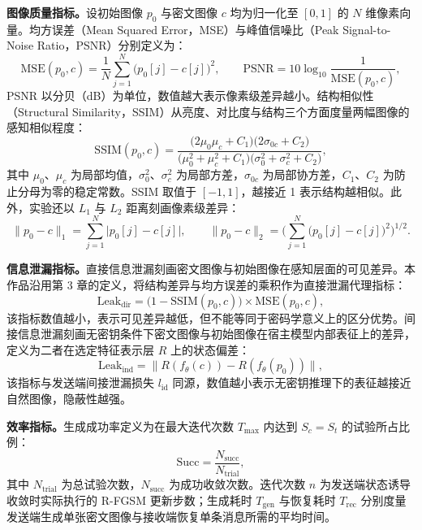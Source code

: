 \textbf{图像质量指标。}设初始图像 \(p_0\) 与密文图像 \(c\) 均为归一化至 \([0,1]\) 的 \(N\) 维像素向量。均方误差（Mean Squared Error，MSE）与峰值信噪比（Peak Signal-to-Noise Ratio，PSNR）分别定义为：
\begin{equation}
    \mathrm{MSE}(p_0,c)=\frac{1}{N}\sum_{j=1}^{N}\big(p_0[j]-c[j]\big)^2,\qquad
    \mathrm{PSNR}=10\log_{10}\frac{1}{\mathrm{MSE}(p_0,c)},
    \label{eq:mse-psnr}
\end{equation}
PSNR 以分贝（dB）为单位，数值越大表示像素级差异越小。结构相似性（Structural Similarity，SSIM）从亮度、对比度与结构三个方面度量两幅图像的感知相似程度：
\begin{equation}
    \mathrm{SSIM}(p_0,c)=\frac{\big(2\mu_0\mu_c+C_1\big)\big(2\sigma_{0c}+C_2\big)}
    {\big(\mu_0^2+\mu_c^2+C_1\big)\big(\sigma_0^2+\sigma_c^2+C_2\big)},
    \label{eq:ssim}
\end{equation}
其中 \(\mu_0\)、\(\mu_c\) 为局部均值，\(\sigma_0^2\)、\(\sigma_c^2\) 为局部方差，\(\sigma_{0c}\) 为局部协方差，\(C_1\)、\(C_2\) 为防止分母为零的稳定常数。SSIM 取值于 \([-1,1]\)，越接近 1 表示结构越相似。此外，实验还以 \(L_1\) 与 \(L_2\) 距离刻画像素级差异：
\begin{equation}
    \|p_0-c\|_1=\sum_{j=1}^{N}\big|p_0[j]-c[j]\big|,\qquad
    \|p_0-c\|_2=\Big(\sum_{j=1}^{N}\big(p_0[j]-c[j]\big)^2\Big)^{1/2}.
    \label{eq:l12}
\end{equation}

\textbf{信息泄漏指标。}直接信息泄漏刻画密文图像与初始图像在感知层面的可见差异。本作品沿用第 3 章的定义，将结构差异与均方误差的乘积作为直接泄漏代理指标：
\begin{equation}
    \mathrm{Leak}_{\mathrm{dir}}=\big(1-\mathrm{SSIM}(p_0,c)\big)\times\mathrm{MSE}(p_0,c),
    \label{eq:leak-dir}
\end{equation}
该指标数值越小，表示可见差异越低，但不能等同于密码学意义上的区分优势。间接信息泄漏刻画无密钥条件下密文图像与初始图像在宿主模型内部表征上的差异，定义为二者在选定特征表示层 \(R\) 上的状态偏差：
\begin{equation}
    \mathrm{Leak}_{\mathrm{ind}}=\big\|R(f_\theta(c))-R(f_\theta(p_0))\big\|,
    \label{eq:leak-ind}
\end{equation}
该指标与发送端间接泄漏损失 \(l_{\mathrm{id}}\) 同源，数值越小表示无密钥推理下的表征越接近自然图像，隐蔽性越强。

\textbf{效率指标。}生成成功率定义为在最大迭代次数 \(T_{\max}\) 内达到 \(S_c=S_t\) 的试验所占比例：
\begin{equation}
    \mathrm{Succ}=\frac{N_{\mathrm{succ}}}{N_{\mathrm{trial}}},
    \label{eq:succ}
\end{equation}
其中 \(N_{\mathrm{trial}}\) 为总试验次数，\(N_{\mathrm{succ}}\) 为成功收敛次数。迭代次数 \(n\) 为发送端状态诱导收敛时实际执行的 R-FGSM 更新步数；生成耗时 \(T_{\mathrm{gen}}\) 与恢复耗时 \(T_{\mathrm{rec}}\) 分别度量发送端生成单张密文图像与接收端恢复单条消息所需的平均时间。

